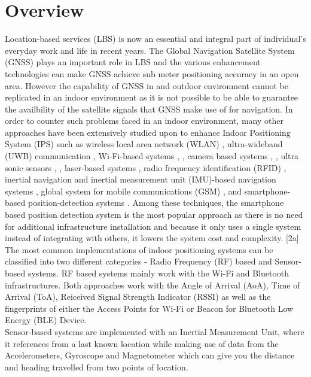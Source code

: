 \documentclass{l4proj}
\begin{document}
\section{Overview}
Location-based services (LBS) is now an essential and integral part of individual's everyday work and life in recent years. The Global Navigation Satellite System (GNSS) plays an important role in LBS and the various enhancement technologies can make GNSS achieve sub meter positioning accuracy in an open area. \cite{yzhuang} However the capability of GNSS in and outdoor environment cannot be replicated in an indoor environment as it is not possible to be able to guarantee the availbility of the satellite signals that GNSS make use of for navigation. In order to counter such problems faced in an indoor environment, many other approaches have been extensively studied upon to enhance Indoor Positioning System (IPS) such as wireless local area network (WLAN) \cite{yzhuang}, ultra-wideband (UWB) communication \cite{arjimenez}\cite{yzhuang2}, Wi-Fi-based systems \cite{aspaul}\cite{mnhusen}, \cite{dfllorca}, camera based systems \cite{nparnian}, \cite{sykim}, ultra sonic sensors \cite{mhazas}, \cite{dsobers}, laser-based systems \cite{saab}, radio frequency identification (RFID) \cite{shouse}\cite{arjruiz}\cite{jhuang}\cite{arjimenez2}, inertial navigation and inertial measurement unit (IMU)-based navigation systems \cite{hyang}\cite{jbenikovsky}, global system for mobile communications (GSM) \cite{votsason}\cite{rgorak}\cite{votsason2}\cite{avarshavsky}, and smartphone-based position-detection systems \cite{rzhang}\cite{yliu}\cite{hsu}\cite{emartin}. Among these techniques, the smartphone based position detection system is the most popular approach as there is no need for additional infrastructure installation and because it only uses a single system instead of integrating with others, it lowers the system cost and complexity. [2a]\\

The most common implementations of indoor positioning systems can be classified into two different categories - Radio Frequency (RF) based and Sensor-based systems. RF based systems mainly work with the Wi-Fi and Bluetooth infrastructures. Both approaches work with the Angle of Arrival (AoA), Time of Arrival (ToA), Reiceived Signal Strength Indicator (RSSI) as well as the fingerprints of either the Access Points for Wi-Fi or Beacon for Bluetooth Low Energy (BLE) Device.\\

Sensor-based systems are implemented with an Inertial Measurement Unit, where it references from a last known location while making use of data from the Accelerometers, Gyroscope and Magnetometer which can give you the distance and heading travelled from two points of location.\\
\end{document}
